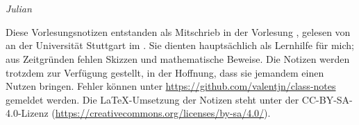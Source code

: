 \part{\vorlesung{}}
\thispagestyle{empty}

\emph{Julian }

\vspace*{1em}

Diese Vorlesungsnotizen entstanden als Mitschrieb in der Vorlesung \vorlesung{},
gelesen von \dozent{} an der Universität Stuttgart im \semester{}.
Sie dienten hauptsächlich als Lernhilfe für mich;
aus Zeitgründen fehlen Skizzen und mathematische Beweise.
Die Notizen werden trotzdem zur Verfügung gestellt, in der Hoffnung,
dass sie jemandem einen Nutzen bringen.
Fehler können unter \url{https://github.com/valentjn/class-notes} gemeldet werden.
Die \LaTeX{}-Umsetzung der Notizen steht unter der CC-BY-SA-4.0-Lizenz
(\url{https://creativecommons.org/licenses/by-sa/4.0/}).

{%
  \renewcommand*{\chaptermarkformat}{}

  \renewcommand*{\contentsname}{Inhaltsverzeichnis dieser Vorlesung}

  \localtableofcontents%
}

\pagebreak
